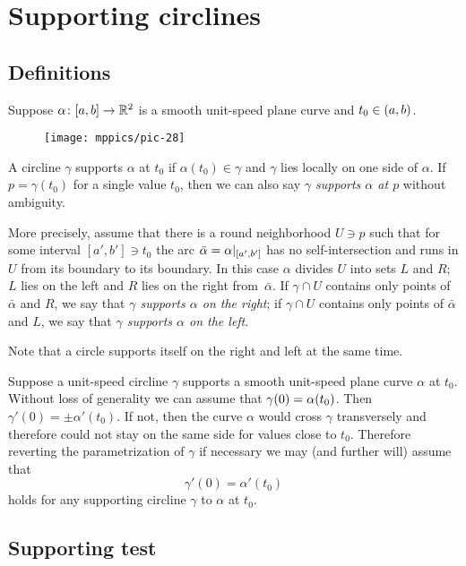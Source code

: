 \chapter{Supporting circlines}

\section{Definitions}

Suppose $\alpha\colon[a,b]\to\mathbb{R}^2$ is a smooth unit-speed plane curve and $t_0\z\in(a,b)$.

\begin{wrapfigure}{r}{43 mm}
\vskip-4mm
\centering
\texttt{[image: mppics/pic-28]}
\vskip0mm
\end{wrapfigure}

A circline $\gamma$ supports $\alpha$ at $t_0$ if $\alpha(t_0)\in\gamma$
and $\gamma$ lies locally on one side of $\alpha$.
If $p=\gamma(t_0)$ for a single value $t_0$,
then we can also say \emph{$\gamma$ supports $\alpha$ at $p$} without ambiguity.

More precisely, assume that there is a round neighborhood $U\ni p$ such that for some interval $[a',b']\ni t_0$
the arc $\bar\alpha\z=\alpha|_{[a',b']}$ has no self-intersection and runs in $U$ from its boundary to its boundary.
In this case $\alpha$ divides $U$ into sets  $L$ and $R$;
$L$ lies on the left and $R$ lies on the right from~$\bar\alpha$.
If $\gamma\cap U$ contains only points of $\bar\alpha$ and $R$, we say that \emph{$\gamma$ supports $\alpha$ on the right};
if $\gamma\cap U$ contains only points of $\bar\alpha$ and $L$, we say that \emph{$\gamma$ supports $\alpha$ on the left}.



Note that a circle supports itself on the right and left at the same time.

Suppose a unit-speed circline $\gamma$ supports a smooth unit-speed plane curve $\alpha$ at $t_0$.
Without loss of generality we can assume that $\gamma(0)\z=\alpha(t_0)$. 
Then $\gamma'(0)=\pm\alpha'(t_0)$.
If not, then the curve $\alpha$ would cross $\gamma$ transversely and therefore could not stay on the same side for values close to $t_0$.
Therefore reverting the parametrization of $\gamma$ if necessary we may (and further will) assume that 
\[\gamma'(0)=\alpha'(t_0)\]
holds for any supporting circline $\gamma$ to $\alpha$ at $t_0$.

\section{Supporting test}

